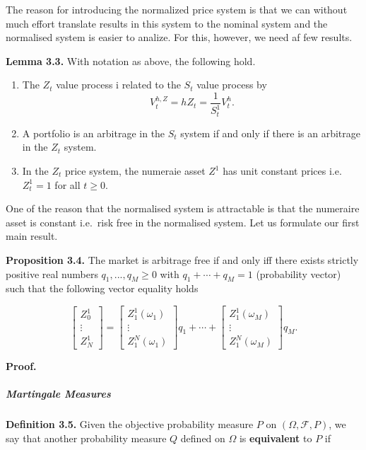 \documentclass[
]{article}
\providecommand{\tightlist}{%
  \setlength{\itemsep}{0pt}\setlength{\parskip}{0pt}}
\begin{document}
The reason for introducing the normalized price system is that we can
without much effort translate results in this system to the nominal
system and the normalised system is easier to analize. For this,
however, we need af few results.

\textbf{Lemma 3.3.} With notation as above, the following hold.

\begin{enumerate}
\def\labelenumi{\arabic{enumi}.}
\tightlist
\item
  The \(Z_t\) value process i related to the \(S_t\) value process by \[
    V_t^{h,Z}=hZ_t=\frac{1}{S_t^1}V_t^h.
    \]
\item
  A portfolio is an arbitrage in the \(S_t\) system if and only if there
  is an arbitrage in the \(Z_t\) system.
\item
  In the \(Z_t\) price system, the numeraie asset \(Z^1\) has unit
  constant prices i.e.~\(Z_t^1=1\) for all \(t\ge 0\).
\end{enumerate}

One of the reason that the normalised system is attractable is that the
numeraire asset is constant i.e.~risk free in the normalised system. Let
us formulate our first main result.

\textbf{Proposition 3.4.} The market is arbitrage free if and only iff
there exists strictly positive real numbers \(q_1,...,q_M\ge 0\) with
\(q_1+\cdots + q_M=1\) (probability vector) such that the following
vector equality holds

\[
\begin{bmatrix} Z_0^1\\
\vdots\\
Z_N^1\end{bmatrix}=\begin{bmatrix} Z_1^1(\omega_1)\\
\vdots\\
Z_1^N(\omega_1)\end{bmatrix}q_1+\cdots +\begin{bmatrix} Z_1^1(\omega_M)\\
\vdots\\
Z_1^N(\omega_M)\end{bmatrix}q_M.\tag{3.3}
\]

\textbf{Proof.}

\hypertarget{martingale-measures}{%
\subparagraph{Martingale Measures}\label{martingale-measures}}

\textbf{Definition 3.5.} Given the objective probability measure \(P\)
on \((\Omega,\mathcal{F},P)\), we say that another probability measure
\(Q\) defined on \(\Omega\) is \textbf{equivalent} to \(P\) if
\end{document}
